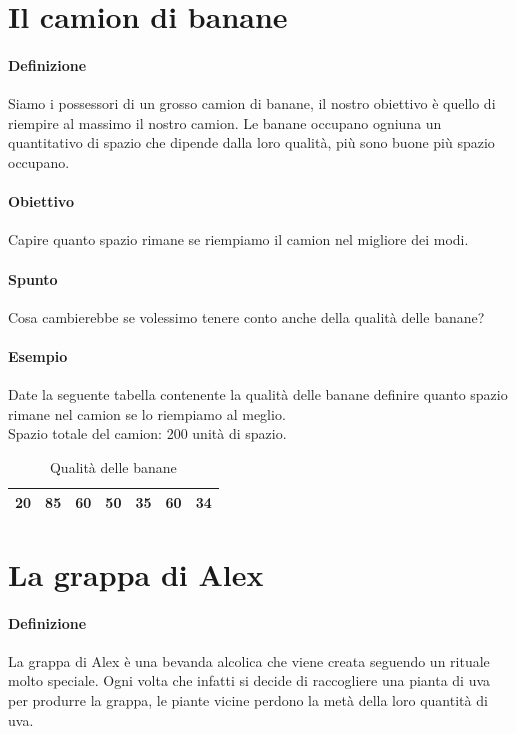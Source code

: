 \setlength{\parskip}{0pt}
\titlespacing*{\subparagraph}{1em}{0em}{0em} 

\thispagestyle{chapterInit}
\section*{Il camion di banane}
    \paragraph{Definizione} Siamo i possessori di un grosso camion di banane, il nostro obiettivo è quello di riempire al massimo il nostro camion. Le banane occupano ogniuna un quantitativo di spazio che dipende dalla loro qualità, più sono buone più spazio occupano.
    \paragraph{Obiettivo} Capire quanto spazio rimane se riempiamo il camion nel migliore dei modi.
    \paragraph{Spunto} Cosa cambierebbe se volessimo tenere conto anche della qualità delle banane?
    \paragraph{Esempio} Date la seguente tabella contenente la qualità delle banane definire quanto spazio rimane nel camion se lo riempiamo al meglio. \\
    Spazio totale del camion: 200 unità di spazio.

    \begin{table}[h!]
        \centering
        \caption{Qualità delle banane}
        \label{tab:qualita_banane}
        \begin{tabular}{|c|c|c|c|c|c|c|}
        \hline
            20 & 85 & 60 & 50 & 35 & 60 & 34\\ \hline
        \end{tabular}
    \end{table}

\newpage
\thispagestyle{chapterInit}
\section*{La grappa di Alex}
    \paragraph{Definizione} La grappa di Alex è una bevanda alcolica che viene creata seguendo un rituale molto speciale. Ogni volta che infatti si decide di raccogliere una pianta di uva per produrre la grappa, le piante vicine perdono la metà della loro quantità di uva.
